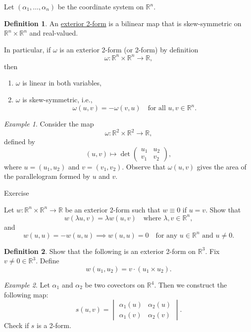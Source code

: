 \documentclass[11pt]{article}
\theoremstyle{definition}
\newtheorem{definition}{Definition}[section]
\theoremstyle{remark}
\newtheorem{example}{Example}[section]
\begin{document}
Let $(\alpha_1, \dots, \alpha_n)$ be the coordinate system on $\mathbb{R}^n$.

\begin{definition}\label{def:exterior_2_form}
An \underline{exterior 2-form} is a bilinear map that is skew-symmetric on $\mathbb{R}^n \times \mathbb{R}^n$ and real-valued.

In particular, if $\omega$ is an exterior 2-form (or 2-form) by definition
\[
\omega \colon \mathbb{R}^n \times \mathbb{R}^n \to \mathbb{R},
\]
then
\begin{enumerate}
    \item $\omega$ is linear in both variables,
    \item $\omega$ is skew-symmetric, i.e.,
    \[
    \omega(u, v) = -\omega(v, u) \quad \text{for all } u, v \in \mathbb{R}^n.
    \]
\end{enumerate}
\end{definition}

\begin{example}\label{ex:determinant_2_form}
Consider the map
\[
\omega \colon \mathbb{R}^2 \times \mathbb{R}^2 \to \mathbb{R},
\]
defined by
\[
(u, v) \mapsto \det \begin{pmatrix} u_1 & u_2 \\ v_1 & v_2 \end{pmatrix},
\]
where $u = (u_1, u_2)$ and $v = (v_1, v_2)$. Observe that $\omega(u, v)$ gives the area of the parallelogram formed by $u$ and $v$.
\end{example}

Exercise

Let $w \colon \mathbb{R}^n \times \mathbb{R}^n \to \mathbb{R}$ be an exterior 2-form such that $w \equiv 0$ if $u = v$. Show that
\[ w(\lambda u, v) = \lambda w(u, v) \quad \text{where } \lambda, v \in \mathbb{R}^n, \]
and
\[ w(u, u) = -w(u, u) \implies w(u, u) = 0 \quad \text{for any } u \in \mathbb{R}^n \text{ and } u \neq 0. \]

\begin{definition}\label{def:exterior_2_form_R3}
Show that the following is an exterior 2-form on $\mathbb{R}^3$. Fix $v \neq 0 \in \mathbb{R}^3$. Define
\[ w(u_1, u_2) = v \cdot (u_1 \times u_2). \]
\end{definition}

\begin{example}\label{ex:covectors_map}
Let $\alpha_1$ and $\alpha_2$ be two covectors on $\mathbb{R}^4$. Then we construct the following map:
\[ s(u, v) = \begin{vmatrix}
\alpha_1(u) & \alpha_2(u) \\
\alpha_1(v) & \alpha_2(v)
\end{vmatrix}. \]
Check if $s$ is a 2-form.
\end{example}
\end{document}
